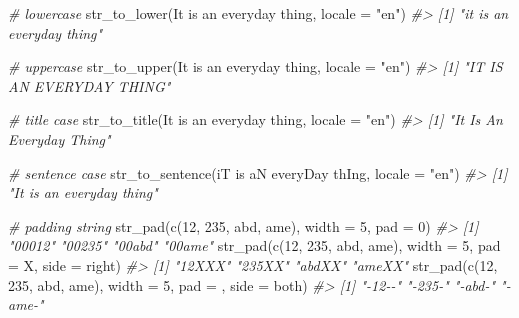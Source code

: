 \documentclass[
]{book}
\newenvironment{Shaded}{\begin{snugshade}}{\end{snugshade}}
\newcommand{\AttributeTok}[1]{\textcolor[rgb]{0.77,0.63,0.00}{#1}}
\newcommand{\CommentTok}[1]{\textcolor[rgb]{0.56,0.35,0.01}{\textit{#1}}}
\newcommand{\DecValTok}[1]{\textcolor[rgb]{0.00,0.00,0.81}{#1}}
\newcommand{\FunctionTok}[1]{\textcolor[rgb]{0.00,0.00,0.00}{#1}}
\newcommand{\NormalTok}[1]{#1}
\newcommand{\StringTok}[1]{\textcolor[rgb]{0.31,0.60,0.02}{#1}}
\begin{document}
\begin{Shaded}
\begin{Highlighting}[]
\CommentTok{\# lowercase}
\FunctionTok{str\_to\_lower}\NormalTok{(}\StringTok{\textquotesingle{}It is an everyday thing\textquotesingle{}}\NormalTok{, }\AttributeTok{locale =} \StringTok{"en"}\NormalTok{)}
\CommentTok{\#\textgreater{} [1] "it is an everyday thing"}

\CommentTok{\# uppercase}
\FunctionTok{str\_to\_upper}\NormalTok{(}\StringTok{\textquotesingle{}It is an everyday thing\textquotesingle{}}\NormalTok{, }\AttributeTok{locale =} \StringTok{"en"}\NormalTok{)}
\CommentTok{\#\textgreater{} [1] "IT IS AN EVERYDAY THING"}

\CommentTok{\# title case}
\FunctionTok{str\_to\_title}\NormalTok{(}\StringTok{\textquotesingle{}It is an everyday thing\textquotesingle{}}\NormalTok{, }\AttributeTok{locale =} \StringTok{"en"}\NormalTok{)}
\CommentTok{\#\textgreater{} [1] "It Is An Everyday Thing"}

\CommentTok{\# sentence case}
\FunctionTok{str\_to\_sentence}\NormalTok{(}\StringTok{\textquotesingle{}iT is aN everyDay thIng\textquotesingle{}}\NormalTok{, }\AttributeTok{locale =} \StringTok{"en"}\NormalTok{)}
\CommentTok{\#\textgreater{} [1] "It is an everyday thing"}

\CommentTok{\# padding string}
\FunctionTok{str\_pad}\NormalTok{(}\FunctionTok{c}\NormalTok{(}\DecValTok{12}\NormalTok{, }\DecValTok{235}\NormalTok{, }\StringTok{\textquotesingle{}abd\textquotesingle{}}\NormalTok{, }\StringTok{\textquotesingle{}ame\textquotesingle{}}\NormalTok{), }\AttributeTok{width =} \DecValTok{5}\NormalTok{, }\AttributeTok{pad =} \StringTok{\textquotesingle{}0\textquotesingle{}}\NormalTok{)}
\CommentTok{\#\textgreater{} [1] "00012" "00235" "00abd" "00ame"}
\FunctionTok{str\_pad}\NormalTok{(}\FunctionTok{c}\NormalTok{(}\DecValTok{12}\NormalTok{, }\DecValTok{235}\NormalTok{, }\StringTok{\textquotesingle{}abd\textquotesingle{}}\NormalTok{, }\StringTok{\textquotesingle{}ame\textquotesingle{}}\NormalTok{), }\AttributeTok{width =} \DecValTok{5}\NormalTok{, }\AttributeTok{pad =} \StringTok{\textquotesingle{}X\textquotesingle{}}\NormalTok{, }\AttributeTok{side =} \StringTok{\textquotesingle{}right\textquotesingle{}}\NormalTok{)}
\CommentTok{\#\textgreater{} [1] "12XXX" "235XX" "abdXX" "ameXX"}
\FunctionTok{str\_pad}\NormalTok{(}\FunctionTok{c}\NormalTok{(}\DecValTok{12}\NormalTok{, }\DecValTok{235}\NormalTok{, }\StringTok{\textquotesingle{}abd\textquotesingle{}}\NormalTok{, }\StringTok{\textquotesingle{}ame\textquotesingle{}}\NormalTok{), }\AttributeTok{width =} \DecValTok{5}\NormalTok{, }\AttributeTok{pad =} \StringTok{\textquotesingle{}{-}\textquotesingle{}}\NormalTok{, }\AttributeTok{side =} \StringTok{\textquotesingle{}both\textquotesingle{}}\NormalTok{)}
\CommentTok{\#\textgreater{} [1] "{-}12{-}{-}" "{-}235{-}" "{-}abd{-}" "{-}ame{-}"}


\end{Highlighting}
\end{Shaded}
\end{document}
